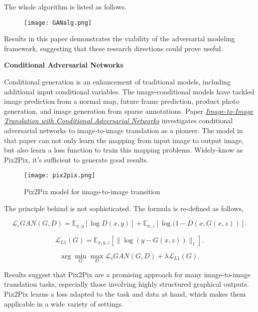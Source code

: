 \documentclass[a4paper]{article}
\begin{document}
The whole algorithm is listed as follows.

\begin{figure}[h]
\centering
\texttt{[image: GANalg.png]}
\end{figure}

Results in this paper demonstrates the viability of the adversarial modeling framework, suggesting that these research directions could prove useful.

\vspace{2mm}
\begin{center}
\large\textbf{Conditional Adversarial Networks}
\end{center}
\vspace{1mm}
\large{

Conditional generation is an enhancement of traditional models, including additional input conditional variables. The image-conditional models have tackled image prediction from a normal map, future frame prediction, product photo generation, and image generation from sparse annotations. Paper \href{https://arxiv.org/pdf/1611.07004.pdf}{\emph{Image-to-Image Translation with Conditional Adversarial Networks}} investigates conditional adversarial networks to image-to-image translation as a pioneer. The model in that paper can not only learn the mapping from input image to output image, but also learn a loss function to train this mapping problems. Widely-know as \textsf{Pix2Pix}, it's sufficient to generate good results.

\vspace{2mm}
\begin{figure}[H]
\centering
\texttt{[image: pix2pix.png]}
\caption{\textsf{Pix2Pix} model for image-to-image transition}
\end{figure}
\vspace{2mm}

The principle behind is not sophisticated. The formula is re-defined as follows, 

\begin{equation}
\mathcal{L}_c GAN(G,D)=\mathbb{E}_{x,y} [\log D(x,y)] + \mathbb{E}_{x,z} [\log {(1-D(x,G(x,z))}].
\end{equation}

\begin{equation}
\mathcal{L}_{L1}(G)=\mathbb{E}_{x,y,z} [\|\log {(y-G(x,z))}\|_1].
\end{equation}

\begin{equation}
\arg \mathop{\min}_{G}\mathop{\max}_{D}\mathcal{L}_c GAN(G,D)+\lambda \mathcal{L}_{L1}(G).
\end{equation}
\vspace{2mm}

Results suggest that \textsf{Pix2Pix} are a promising approach for many image-to-image translation tasks, especially those involving highly structured graphical outputs. \textsf{Pix2Pix} learns a loss adapted to the task and data at hand, which makes them applicable in a wide variety of settings.

}
\end{document}
